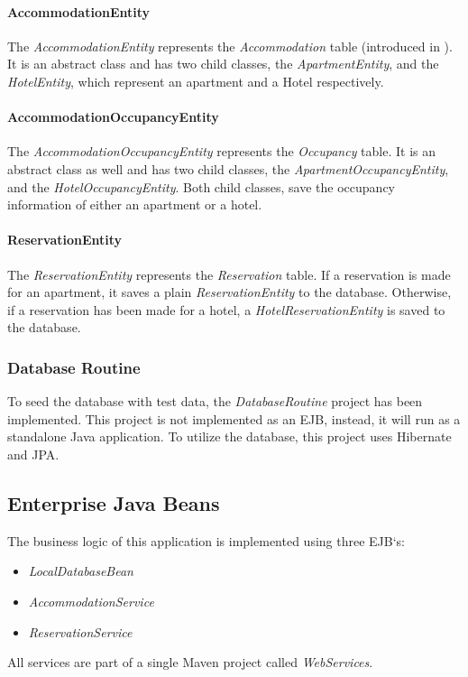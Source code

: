 \paragraph{AccommodationEntity}
The \textit{AccommodationEntity} represents the \textit{Accommodation} table (introduced in ). It is an abstract class and has two child classes, the \textit{ApartmentEntity}, and the \textit{HotelEntity}, which represent an apartment and a Hotel respectively.

\paragraph{AccommodationOccupancyEntity}
The \textit{AccommodationOccupancyEntity} represents the \textit{Occupancy} table. It is an abstract class as well and has two child classes, the \textit{ApartmentOccupancyEntity}, and the \textit{HotelOccupancyEntity}. Both child classes, save the occupancy information of either an apartment or a hotel.


\paragraph{ReservationEntity}
The \textit{ReservationEntity} represents the \textit{Reservation} table. If a reservation is made for an apartment, it saves a plain \textit{ReservationEntity} to the database. Otherwise, if a reservation has been made for a hotel, a \textit{HotelReservationEntity} is saved to the database.

\subsubsection{Database Routine}\label{sec:02_design_db_routine}
To seed the database with test data, the \textit{DatabaseRoutine} project has been implemented.
This project is not implemented as an EJB, instead, it will run as a standalone Java application.
To utilize the database, this project uses Hibernate and JPA.


\newpage
\subsection{Enterprise Java Beans}\label{sec:02_design_beans}
The business logic of this application is implemented using three EJB`s:
\begin{itemize}
\item \textit{LocalDatabaseBean}
\item \textit{AccommodationService}
\item \textit{ReservationService}
\end{itemize}
All services are part of a single Maven project called \textit{WebServices}.

